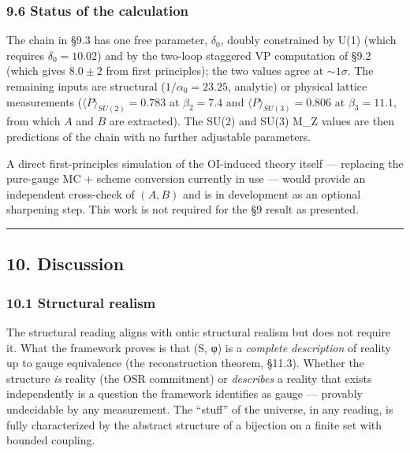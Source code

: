 \documentclass[
  11pt,
]{article}
\begin{document}
\hypertarget{status-of-the-calculation}{%
\subsubsection{9.6 Status of the
calculation}\label{status-of-the-calculation}}

The chain in §9.3 has one free parameter, \(\delta_0\), doubly
constrained by U(1) (which requires \(\delta_0 = 10.02\)) and by the
two-loop staggered VP computation of §9.2 (which gives \(8.0 \pm 2\)
from first principles); the two values agree at \(\sim 1\sigma\). The
remaining inputs are structural (\(1/\alpha_0 = 23.25\), analytic) or
physical lattice measurements (\(\langle P \rangle_{SU(2)} = 0.783\) at
\(\beta_2 = 7.4\) and \(\langle P \rangle_{SU(3)} = 0.806\) at
\(\beta_3 = 11.1\), from which \(A\) and \(B\) are extracted). The SU(2)
and SU(3) M\_Z values are then predictions of the chain with no further
adjustable parameters.

A direct first-principles simulation of the OI-induced theory itself ---
replacing the pure-gauge MC + scheme conversion currently in use ---
would provide an independent cross-check of \((A, B)\) and is in
development as an optional sharpening step. This work is not required
for the §9 result as presented.

\begin{center}\rule{0.5\linewidth}{0.5pt}\end{center}

\hypertarget{discussion}{%
\subsection{10. Discussion}\label{discussion}}

\hypertarget{structural-realism}{%
\subsubsection{10.1 Structural realism}\label{structural-realism}}

The structural reading aligns with ontic structural realism but does not
require it. What the framework proves is that (S, φ) is a \emph{complete
description} of reality up to gauge equivalence (the reconstruction
theorem, §11.3). Whether the structure \emph{is} reality (the OSR
commitment) or \emph{describes} a reality that exists independently is a
question the framework identifies as gauge --- provably undecidable by
any measurement. The ``stuff'' of the universe, in any reading, is fully
characterized by the abstract structure of a bijection on a finite set
with bounded coupling.
\end{document}
